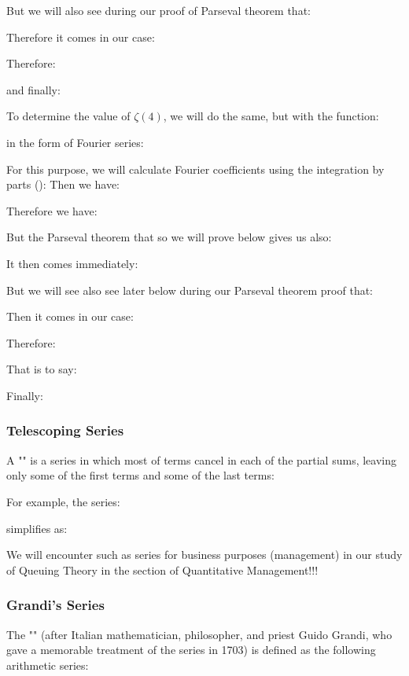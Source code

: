 	But we will also see during our proof of Parseval theorem that:
	
	Therefore it comes in our case:
	
	Therefore:
	
	and finally:
	
	
	To determine the value of $\zeta(4)$, we will do the same, but with the function:
	
	in the form of Fourier series:
	
	For this purpose, we will calculate Fourier coefficients using the integration by parts ():
	Then we have:
	
	Therefore we have:
	
	But the Parseval theorem that so we will prove below gives us also:
	
	It then comes immediately:
	
	But we will see also see later below during our Parseval theorem proof that:
	
	Then it comes in our case:
	
	Therefore:
	
	That is to say:
	
	Finally:
	
	
	\subsubsection{Telescoping Series}
	A "" is a series in which most of terms cancel in each of the partial sums, leaving only some of the first terms and some of the last terms:
	
	For example, the series:
	
	simplifies as:
	
	We will encounter such as series for business purposes (management) in our study of Queuing Theory in the section of Quantitative Management!!!
	
	\subsubsection{Grandi's Series}
	The "" (after Italian mathematician, philosopher, and priest Guido Grandi, who gave a memorable treatment of the series in 1703) is defined as the following arithmetic series:
	
